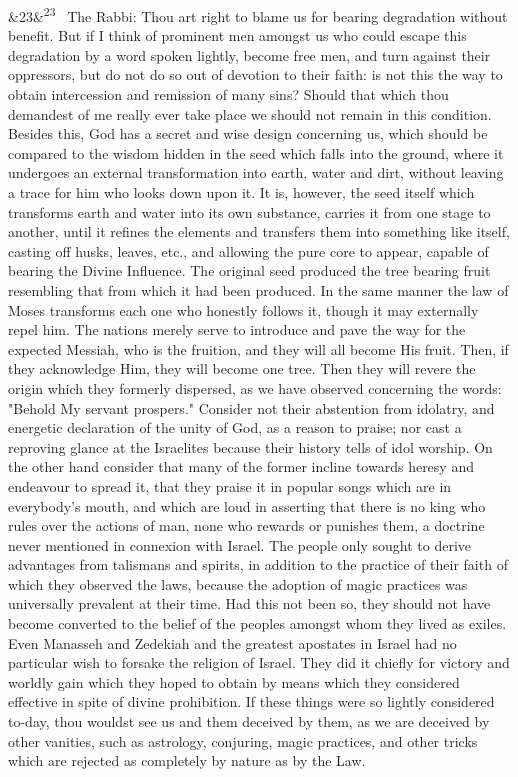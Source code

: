 \documentclass[12pt]{article}
\newcommand{\para}[1][]{\par\noindent\ifx&#1&\else\textsuperscript{\footnotesize #1}~\fi}
\begin{document}
\para[23] The Rabbi: Thou art right to blame us for bearing degradation without benefit. But if I think of prominent men amongst us who could escape this degradation by a word spoken lightly, become free men, and turn against their oppressors, but do not do so out of devotion to their faith: is not this the way to obtain intercession and remission of many sins? Should that which thou demandest of me really ever take place we should not remain in this condition. Besides this, God has a secret and wise design concerning us, which should be compared to the wisdom hidden in the seed which falls into the ground, where it undergoes an external transformation into earth, water and dirt, without leaving a trace for him who looks down upon it. It is, however, the seed itself which transforms earth and water into its own substance, carries it from one stage to another, until it refines the elements and transfers them into something like itself, casting off husks, leaves, etc., and allowing the pure core to appear, capable of bearing the Divine Influence. The original seed produced the tree bearing fruit resembling that from which it had been produced. In the same manner the law of Moses transforms each one who honestly follows it, though it may externally repel him. The nations merely serve to introduce and pave the way for the expected Messiah, who is the fruition, and they will all become His fruit. Then, if they acknowledge Him, they will become one tree. Then they will revere the origin which they formerly dispersed, as we have observed concerning the words: "Behold My servant prospers." Consider not their abstention from idolatry, and energetic declaration of the unity of God, as a reason to praise; nor cast a reproving glance at the Israelites because their history tells of idol worship. On the other hand consider that many of the former incline towards heresy and endeavour to spread it, that they praise it in popular songs which are in everybody's mouth, and which are loud in asserting that there is no king who rules over the actions of man, none who rewards or punishes them, a doctrine never mentioned in connexion with Israel. The people only sought to derive advantages from talismans and spirits, in addition to the practice of their faith of which they observed the laws, because the adoption of magic practices was universally prevalent at their time. Had this not been so, they should not have become converted to the belief of the peoples amongst whom they lived as exiles. Even Manasseh and Zedekiah and the greatest apostates in Israel had no particular wish to forsake the religion of Israel. They did it chiefly for victory and worldly gain which they hoped to obtain by means which they considered effective in spite of divine prohibition. If these things were so lightly considered to-day, thou wouldst see us and them deceived by them, as we are deceived by other vanities, such as astrology, conjuring, magic practices, and other tricks which are rejected as completely by nature as by the Law.
\end{document}
